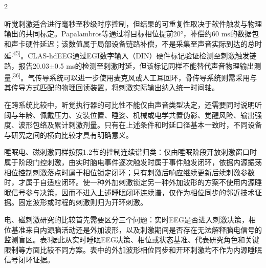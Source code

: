 \documentclass[UTF8,zihao=5,fontset=none]{ctexart}
\newcommand{\hei}{\CJKfamily{hei}}
\newcommand{\leveltwo}[1]{%
  \par\noindent{\hei\fontsize{10.5pt}{12.6pt}\selectfont\mdseries #1\par}}
\newcommand{\refcite}[1]{\nolinebreak[4]\textsuperscript{[#1]}}
\begin{document}
\begin{multicols}{2}

听觉刺激适合进行毫秒至秒级时序控制，但结果的可重复性取决于软件触发与物理输出的共同标定。Papalambros等通过将目标相位提前20°，补偿约60 ms的数据包和声卡硬件延迟；该数值属于局部设备链路补偿，不是采集至声音实际到达的总时延\refcite{45}。CLAS-hdEEG通过EGI数字输入（DIN）硬件标记验证检测至刺激触发链路，报告20.03$\pm$0.5 ms的检测至刺激时延，但该标记同样不能替代声音物理输出测量\refcite{36}。气传导系统可以进一步使用麦克风或人工耳回环，骨传导系统则需采用与其传导方式匹配的物理回读装置，将刺激实际输出纳入统一时间轴。\par

在跨系统比较中，听觉执行器的可比性不能仅由声音类型决定，还需要同时说明听阈与年龄、佩戴压力、安装位置、睡姿、机械或电学共置伪影、觉醒风险、输出强度、波形包络及累计刺激剂量。只有在上述条件和时延口径基本一致时，不同设备与研究之间的横向比较才具有明确意义。\par

\leveltwo{5.2 电刺激与磁刺激}

睡眠电、磁刺激同样按照1.2节的控制连续谱归类：仅由睡眠阶段开放刺激窗口时属于阶段门控刺激，由实时脑电事件逐次触发时属于事件触发闭环，依据内源振荡相位控制刺激落点时属于相位锁定闭环；只有刺激后响应继续更新后续刺激参数时，才属于自适应闭环。使一种外加刺激锁定另一种外加波形的方案不使用内源睡眠信号参与决策，因而不进入上述睡眠闭环连续谱，仅作为相位同步的邻近技术证据。固定波形或时程的刺激则归为开环刺激。\par

电、磁刺激研究的比较首先需要区分三个问题：实时EEG是否进入刺激决策，相位基准来自内源脑活动还是外加波形，以及刺激期间是否存在无法解释脑电信号的监测盲区。表3据此从实时睡眠EEG决策、相位或状态基准、代表研究角色和关键限制等方面比较不同方案。表中的外加波形相位同步和开环刺激均不作为内源睡眠信号闭环证据。\par

\end{multicols}
\end{document}
